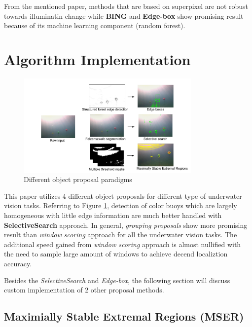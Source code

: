 \documentclass[hyp]{socreport}
\begin{document}
From the mentioned paper, methods that are based on superpixel are not robust
towards illuminatin change while \textbf{BING}  and
\textbf{Edge-box}  show promising result because of its
machine learning component (random forest).

\section{Algorithm Implementation}

\begin{figure}[H]
\centering
  \includegraphics[width=0.8\textwidth, height=0.3\textheight]{proposals_results.png}
  \caption{Different object proposal paradigms}
  \label{fig:proposal_results}
\end{figure}

This paper utilizes 4 different object proposals for different type of
underwater vision tasks. Referring to Figure \ref{fig:proposal_results},
detection of color buoys which are largely homogeneous with little edge
information are much better handled with \textbf{SelectiveSearch}
 approach. In general, \textit{grouping
  proposals} show more promising result than \textit{window scoring} approach
for all the underwater vision tasks. The additional speed gained from
\textit{window scoring} approach is almost nullified with the need to sample
large amount of windows to achieve decend localiztion accuracy.

Besides the \textit{SelectiveSearch} and \textit{Edge-box}, the following
section will discuss custom implementation of 2 other proposal methods.

\subsection{Maximially Stable Extremal Regions (MSER)}
\end{document}
